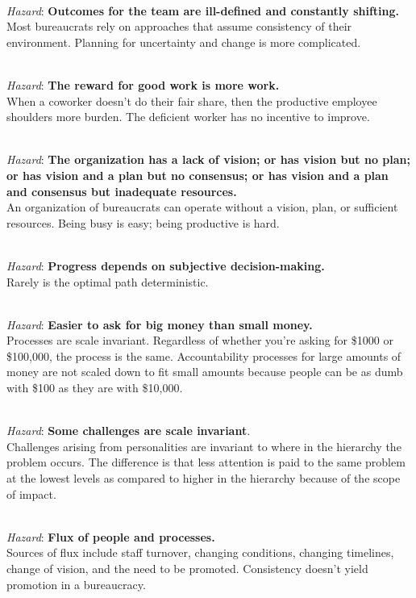 \ \\
\textit{Hazard}: \textbf{Outcomes for the team are ill-defined and constantly shifting.}\\
Most bureaucrats rely on approaches that assume consistency of their environment. Planning for uncertainty and change is more complicated.

\ \\
\textit{Hazard}: \textbf{The reward for good work is more work.}\\
When a coworker doesn't do their fair share, then the productive employee shoulders more burden. The deficient worker has no incentive to improve.

\ \\
\textit{Hazard}: \textbf{The organization has a lack of vision; or has vision but no plan; or has vision and a plan but no consensus; or has vision and a plan and consensus but inadequate resources.}\\
An organization of bureaucrats can operate without a vision, plan, or sufficient resources. Being busy is easy; being productive is hard.

\ \\
\textit{Hazard}: \textbf{Progress depends on subjective decision-making.}\\
Rarely is the optimal path deterministic. 

\ \\
\textit{Hazard}: \textbf{Easier to ask for big money than small money.}\\
Processes are scale invariant. Regardless of whether you're asking for \$1000 or \$100,000, the process is the same. Accountability processes for large amounts of money are not scaled down to fit small amounts because people can be as dumb with \$100 as they are with \$10,000.


\ \\
\textit{Hazard}: \textbf{Some challenges are scale invariant}.\\
Challenges arising from personalities are invariant to where in the hierarchy the problem occurs. The difference is that less attention is paid to the same problem at the lowest levels as compared to higher in the hierarchy because of the scope of impact.


\ \\
\textit{Hazard}: \textbf{Flux of people and processes.} \\
Sources of flux include staff turnover, changing conditions, changing timelines, change of vision, and the need to be promoted. Consistency doesn't yield promotion in a bureaucracy.

